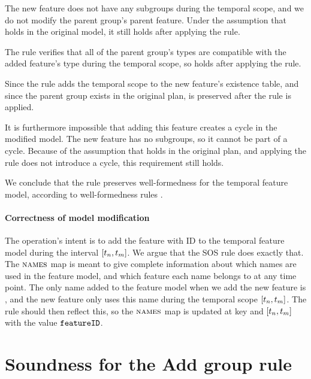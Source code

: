 The new feature does not have any subgroups during the temporal scope, and we do not modify the parent group's parent feature. Under the assumption that  holds in the original model, it still holds after applying the  rule.

The rule verifies that all of the parent group's types are compatible with the added feature's type during the temporal scope, so  holds after applying the rule.

Since the rule adds the temporal scope to the new feature's existence table, and since the parent group exists in the original plan,  is preserved after the rule is applied.

It is furthermore impossible that adding this feature creates a cycle in the modified model. The new feature has no subgroups, so it cannot be part of a cycle. Because of the assumption that  holds in the original plan, and applying the rule does not introduce a cycle, this requirement still holds. 

We conclude that the  rule preserves well-formedness for the temporal feature model, according to well-formedness rules .

\paragraph{Correctness of model modification}

The operation's intent is to add the feature with ID  to the temporal feature model during the interval $\interval{t_n}{t_m}$. We argue that the SOS rule does exactly that. The $\textsc{names}{}$ map is meant to give complete information about which names are used in the feature model, and which feature each name belongs to at any time point. The only name added to the feature model when we add the new feature is , and the new feature only uses this name during the temporal scope $\interval{t_n}{t_m}$. The rule should then reflect this, so the $\textsc{names}{}$ map is updated at key  and $\interval{t_n}{t_m}$ with the value $\texttt{featureID}$.

\section{Soundness for the Add group rule}
\label{sec:soundness-for-the-add-group-rule}

